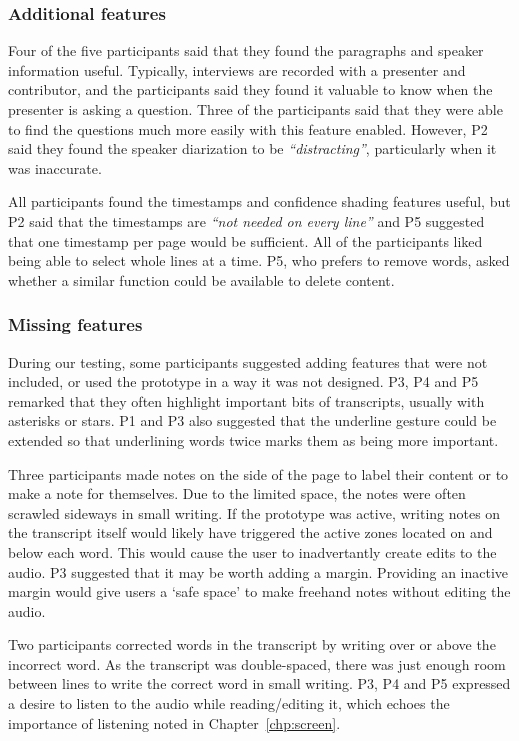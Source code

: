 \subsubsection{Additional features}

Four of the five participants said that they found the paragraphs and speaker information useful. Typically, interviews
are recorded with a presenter and contributor, and the participants said they found it valuable to know when the
presenter is asking a question. Three of the participants said that they were able to find the questions much more
easily with this feature enabled. However, P2 said they found the speaker diarization to be \textit{``distracting''},
particularly when it was inaccurate.

All participants found the timestamps and confidence shading features useful, but P2 said that the timestamps are
\textit{``not needed on every line''} and P5 suggested that one timestamp per page would be sufficient. All of the
participants liked being able to select whole lines at a time. P5, who prefers to remove words, asked whether a similar
function could be available to delete content.

\subsubsection{Missing features}

During our testing, some participants suggested adding features that were not included, or used the prototype in a
way it was not designed.
P3, P4 and P5 remarked that they often highlight important bits of transcripts, usually with asterisks or stars.
P1 and P3 also suggested that the underline gesture could be extended so that underlining words twice marks them as
being more important.

Three participants made notes on the side of the page to label their content or to make a note for themselves. Due to
the limited space, the notes were often scrawled sideways in small writing. If the prototype was active, writing notes
on the transcript itself would likely have triggered the active zones located on and below each word. This would cause
the user to inadvertantly create edits to the audio. P3 suggested that it may be worth adding a margin. Providing an
inactive margin would give users a `safe space' to make freehand notes without editing the audio.

Two participants corrected words in the transcript by writing over or above the incorrect word. As the transcript was
double-spaced, there was just enough room between lines to write the correct word in small writing.
P3, P4 and P5 expressed a desire to listen to the audio while reading/editing it, which echoes the importance of
listening noted in Chapter~\ref{chp:screen}.

